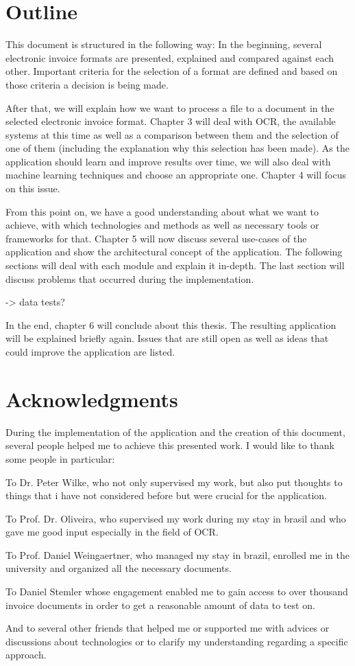 
\section{Outline}
\label{sec1.6}

This document is structured in the following way: In the beginning, several electronic invoice formats are presented, explained and compared against each other. Important criteria for the selection of a format are defined and based on those criteria a decision is being made.

After that, we will explain how we want to process a file to a document in the selected electronic invoice format. Chapter 3 will deal with OCR, the available systems at this time as well as a comparison between them and the selection of one of them (including the explanation why this selection has been made).
As the application should learn and improve results over time, we will also deal with machine learning techniques and choose an appropriate one. Chapter 4 will focus on this issue.

From this point on, we have a good understanding about what we want to achieve, with which technologies and methods as well as necessary tools or frameworks for that. Chapter 5 will now discuss several use-cases of the application and show the architectural concept of the application. The following sections will deal with each module and explain it in-depth. The last section will discuss problems that occurred during the implementation.

-> data tests?

In the end, chapter 6 will conclude about this thesis. The resulting application will be explained briefly again. Issues that are still open as well as ideas that could improve the application are listed.

\section{Acknowledgments}
\label{sec1.7}

During the implementation of the application and the creation of this document, several people helped me to achieve this presented work. I would like to thank some people in particular:

To Dr. Peter Wilke, who not only supervised my work, but also put thoughts to things that i have not considered before but were crucial for the application.

To Prof. Dr. Oliveira, who supervised my work during my stay in brasil and who gave me good input especially in the field of OCR.

To Prof. Daniel Weingaertner, who managed my stay in brazil, enrolled me in the university and organized all the necessary documents.

To Daniel Stemler whose engagement enabled me to gain access to over thousand invoice documents in order to get a reasonable amount of data to test on.

And to several other friends that helped me or supported me with advices or discussions about technologies or to clarify my understanding regarding a specific approach.